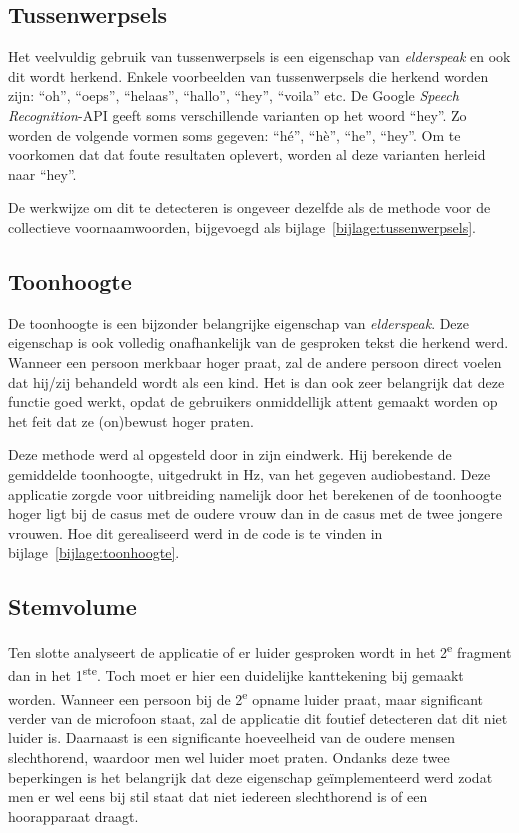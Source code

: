 \subsection{Tussenwerpsels}
Het veelvuldig gebruik van tussenwerpsels is een eigenschap van \textit{elderspeak} en ook dit wordt herkend. Enkele voorbeelden van tussenwerpsels die herkend worden zijn: ``oh'', ``oeps'', ``helaas'', ``hallo'', ``hey'', ``voila'' etc. De Google \textit{Speech Recognition}-API geeft soms verschillende varianten op het woord ``hey''. Zo worden de volgende vormen soms gegeven: ``hé'', ``hè'', ``he'', ``hey''. Om te voorkomen dat dat foute resultaten oplevert, worden al deze varianten herleid naar ``hey''.

De werkwijze om dit te detecteren is ongeveer dezelfde als de methode voor de collectieve voornaamwoorden, bijgevoegd als bijlage~\ref{bijlage:tussenwerpsels}.

\subsection{Toonhoogte}
De toonhoogte is een bijzonder belangrijke eigenschap van \textit{elderspeak}. Deze eigenschap is ook volledig onafhankelijk van de gesproken tekst die herkend werd. Wanneer een persoon merkbaar hoger praat, zal de andere persoon direct voelen dat hij/zij behandeld wordt als een kind. Het is dan ook zeer belangrijk dat deze functie goed werkt, opdat de gebruikers onmiddellijk attent gemaakt worden op het feit dat ze (on)bewust hoger praten.

Deze methode werd al opgesteld door \textcite{Standaert2021} in zijn eindwerk. Hij berekende de gemiddelde toonhoogte, uitgedrukt in Hz, van het gegeven audiobestand. Deze applicatie zorgde voor uitbreiding namelijk door het berekenen of de toonhoogte hoger ligt bij de casus met de oudere vrouw dan in de casus met de twee jongere vrouwen.
Hoe dit gerealiseerd werd in de code is te vinden in bijlage~\ref{bijlage:toonhoogte}.

\subsection{Stemvolume}
Ten slotte analyseert de applicatie of er luider gesproken wordt in het 2\textsuperscript{e} fragment dan in het 1\textsuperscript{ste}. Toch moet er hier een duidelijke kanttekening bij gemaakt worden. Wanneer een persoon bij de 2\textsuperscript{e} opname luider praat, maar significant verder van de microfoon staat, zal de applicatie dit foutief detecteren  dat dit niet luider is. Daarnaast is een significante hoeveelheid van de oudere mensen slechthorend, waardoor men wel luider moet praten. Ondanks deze twee beperkingen is het belangrijk dat deze eigenschap geïmplementeerd werd zodat men er wel eens bij stil staat dat niet iedereen slechthorend is of een hoorapparaat draagt.

